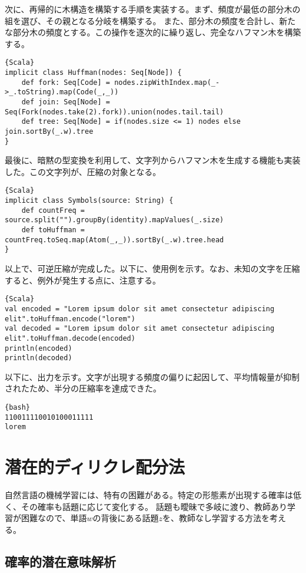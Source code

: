 \documentclass[10pt,a4paper]{book}
\begin{document}
次に、再帰的に木構造を構築する手順を実装する。まず、頻度が最低の部分木の組を選び、その親となる分岐を構築する。
また、部分木の頻度を合計し、新たな部分木の頻度とする。この操作を逐次的に繰り返し、完全なハフマン木を構築する。

\begin{Verbatim}{Scala}
implicit class Huffman(nodes: Seq[Node]) {
	def fork: Seq[Code] = nodes.zipWithIndex.map(_->_.toString).map(Code(_,_))
	def join: Seq[Node] = Seq(Fork(nodes.take(2).fork)).union(nodes.tail.tail)
	def tree: Seq[Node] = if(nodes.size <= 1) nodes else join.sortBy(_.w).tree
}
\end{Verbatim}

最後に、暗黙の型変換を利用して、文字列からハフマン木を生成する機能も実装した。この文字列が、圧縮の対象となる。

\begin{Verbatim}{Scala}
implicit class Symbols(source: String) {
	def countFreq = source.split("").groupBy(identity).mapValues(_.size)
	def toHuffman = countFreq.toSeq.map(Atom(_,_)).sortBy(_.w).tree.head
}
\end{Verbatim}

以上で、可逆圧縮が完成した。以下に、使用例を示す。なお、未知の文字を圧縮すると、例外が発生する点に、注意する。

\begin{Verbatim}{Scala}
val encoded = "Lorem ipsum dolor sit amet consectetur adipiscing elit".toHuffman.encode("lorem")
val decoded = "Lorem ipsum dolor sit amet consectetur adipiscing elit".toHuffman.decode(encoded)
println(encoded)
println(decoded)
\end{Verbatim}

以下に、出力を示す。文字が出現する頻度の偏りに起因して、平均情報量が抑制されたため、半分の圧縮率を達成できた。

\begin{Verbatim}{bash}
110011110010100011111
lorem
\end{Verbatim}

\chapter{潜在的ディリクレ配分法\label{chap:lda}}

自然言語の機械学習には、特有の困難がある。特定の形態素が出現する確率は低く、その確率も話題に応じて変化する。
話題も曖昧で多岐に渡り、教師あり学習が困難なので、単語$w$の背後にある話題$z$を、教師なし学習する方法を考える。

\section{確率的潜在意味解析\label{sect:lda}}
\end{document}
